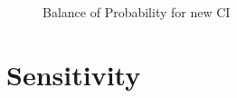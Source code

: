 \begin{figure}
 \hspace{0.5cm}
\caption{Balance of Probability for new CI}
\label{Balance of Probability for new CI}
\end{figure}

\section{Sensitivity}

